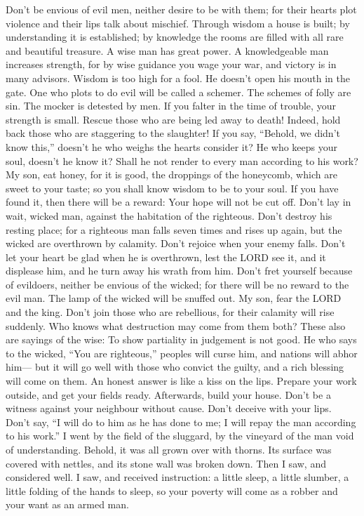  Don't be envious of evil men, neither desire to be with
them;  for their hearts plot violence and their lips talk
about mischief.  Through wisdom a house is built; by
understanding it is established;  by knowledge the rooms are
filled with all rare and beautiful treasure.  A wise man has
great power. A knowledgeable man increases strength,  for by
wise guidance you wage your war, and victory is in many advisors.
 Wisdom is too high for a fool. He doesn't open his mouth in
the gate.  One who plots to do evil will be called a
schemer.  The schemes of folly are sin. The mocker is
detested by men.  If you falter in the time of trouble,
your strength is small.  Rescue those who are being led
away to death! Indeed, hold back those who are staggering to the
slaughter!  If you say, ``Behold, we didn't know this,''
doesn't he who weighs the hearts consider it? He who keeps your soul,
doesn't he know it? Shall he not render to every man according to his
work?  My son, eat honey, for it is good, the droppings of
the honeycomb, which are sweet to your taste;  so you shall
know wisdom to be to your soul. If you have found it, then there will be
a reward: Your hope will not be cut off.  Don't lay in
wait, wicked man, against the habitation of the righteous. Don't destroy
his resting place;  for a righteous man falls seven times
and rises up again, but the wicked are overthrown by calamity.
 Don't rejoice when your enemy falls. Don't let your heart
be glad when he is overthrown,  lest the LORD see it, and
it displease him, and he turn away his wrath from him. 
Don't fret yourself because of evildoers, neither be envious of the
wicked;  for there will be no reward to the evil man. The
lamp of the wicked will be snuffed out.  My son, fear the
LORD and the king. Don't join those who are rebellious, 
for their calamity will rise suddenly. Who knows what destruction may
come from them both?  These also are sayings of the wise:
To show partiality in judgement is not good.  He who says
to the wicked, ``You are righteous,'' peoples will curse him, and
nations will abhor him---  but it will go well with those
who convict the guilty, and a rich blessing will come on them.
 An honest answer is like a kiss on the lips. 
Prepare your work outside, and get your fields ready. Afterwards, build
your house.  Don't be a witness against your neighbour
without cause. Don't deceive with your lips.  Don't say,
``I will do to him as he has done to me; I will repay the man according
to his work.''  I went by the field of the sluggard, by the
vineyard of the man void of understanding.  Behold, it was
all grown over with thorns. Its surface was covered with nettles, and
its stone wall was broken down.  Then I saw, and considered
well. I saw, and received instruction:  a little sleep, a
little slumber, a little folding of the hands to sleep,  so
your poverty will come as a robber and your want as an armed man.

